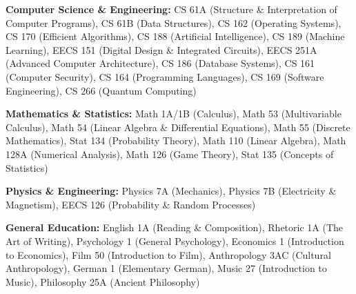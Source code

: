 
\noindent\textbf{Computer Science \& Engineering:} CS 61A (Structure \& Interpretation of Computer Programs), CS 61B (Data Structures), CS 162 (Operating Systems), CS 170 (Efficient Algorithms), CS 188 (Artificial Intelligence), CS 189 (Machine Learning), EECS 151 (Digital Design \& Integrated Circuits), EECS 251A (Advanced Computer Architecture), CS 186 (Database Systems), CS 161 (Computer Security), CS 164 (Programming Languages), CS 169 (Software Engineering), CS 266 (Quantum Computing)

\vspace{0.3em}
\noindent\textbf{Mathematics \& Statistics:} Math 1A/1B (Calculus), Math 53 (Multivariable Calculus), Math 54 (Linear Algebra \& Differential Equations), Math 55 (Discrete Mathematics), Stat 134 (Probability Theory), Math 110 (Linear Algebra), Math 128A (Numerical Analysis), Math 126 (Game Theory), Stat 135 (Concepts of Statistics)

\vspace{0.3em}
\noindent\textbf{Physics \& Engineering:} Physics 7A (Mechanics), Physics 7B (Electricity \& Magnetism), EECS 126 (Probability \& Random Processes)

\vspace{0.3em}
\noindent\textbf{General Education:} English 1A (Reading \& Composition), Rhetoric 1A (The Art of Writing), Psychology 1 (General Psychology), Economics 1 (Introduction to Economics), Film 50 (Introduction to Film), Anthropology 3AC (Cultural Anthropology), German 1 (Elementary German), Music 27 (Introduction to Music), Philosophy 25A (Ancient Philosophy)